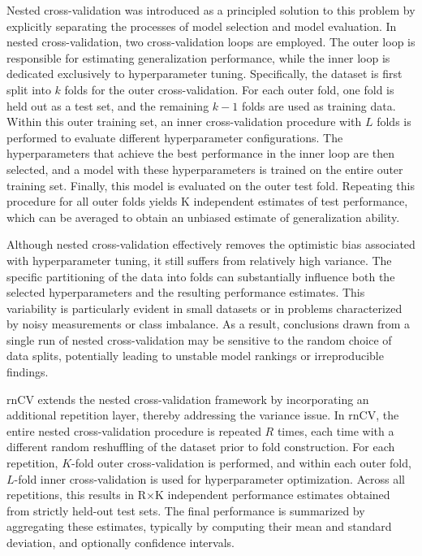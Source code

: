 \documentclass[en]{dimscthesis}
\begin{document}
Nested cross-validation was introduced as a principled solution to this problem by explicitly separating the processes of model selection and model evaluation. In nested cross-validation, two cross-validation loops are employed. The outer loop is responsible for estimating generalization performance, while the inner loop is dedicated exclusively to hyperparameter tuning. Specifically, the dataset is first split into $k$ folds for the outer cross-validation. For each outer fold, one fold is held out as a test set, and the remaining $k−1$ folds are used as training data. Within this outer training set, an inner cross-validation procedure with $L$ folds is performed to evaluate different hyperparameter configurations. The hyperparameters that achieve the best performance in the inner loop are then selected, and a model with these hyperparameters is trained on the entire outer training set. Finally, this model is evaluated on the outer test fold. Repeating this procedure for all outer folds yields K independent estimates of test performance, which can be averaged to obtain an unbiased estimate of generalization ability.

Although nested cross-validation effectively removes the optimistic bias associated with hyperparameter tuning, it still suffers from relatively high variance. The specific partitioning of the data into folds can substantially influence both the selected hyperparameters and the resulting performance estimates. This variability is particularly evident in small datasets or in problems characterized by noisy measurements or class imbalance. As a result, conclusions drawn from a single run of nested cross-validation may be sensitive to the random choice of data splits, potentially leading to unstable model rankings or irreproducible findings.

rnCV extends the nested cross-validation framework by incorporating an additional repetition layer, thereby addressing the variance issue. In rnCV, the entire nested cross-validation procedure is repeated $R$ times, each time with a different random reshuffling of the dataset prior to fold construction. For each repetition, $K$-fold outer cross-validation is performed, and within each outer fold, $L$-fold inner cross-validation is used for hyperparameter optimization. Across all repetitions, this results in R×K independent performance estimates obtained from strictly held-out test sets. The final performance is summarized by aggregating these estimates, typically by computing their mean and standard deviation, and optionally confidence intervals.
\end{document}
